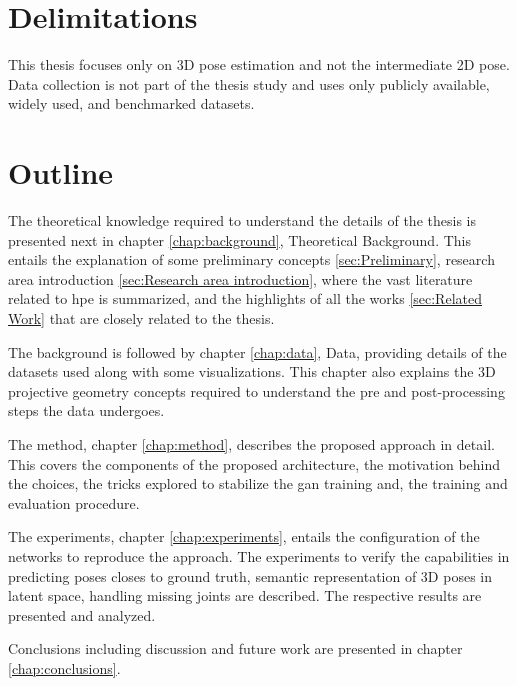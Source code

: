 \section{Delimitations}
\label{sec:delimitations}
This thesis focuses only on 3D pose estimation and not the intermediate 2D pose. Data collection is not part of the thesis study and uses only publicly available, widely used, and benchmarked datasets.

\section{Outline}
\label{sec:outline}
The theoretical knowledge required to understand the details of the thesis is presented next in chapter \ref{chap:background}, Theoretical Background. This entails the explanation of some preliminary concepts \ref{sec:Preliminary}, research area introduction \ref{sec:Research area introduction}, where the vast literature related to \ac{hpe} is summarized, and the highlights of all the works \ref{sec:Related Work} that are closely related to the thesis.

The background is followed by chapter \ref{chap:data}, Data,  providing details of the datasets used along with some visualizations. This chapter also explains the 3D projective geometry concepts required to understand the pre and post-processing steps the data undergoes.

The method, chapter \ref{chap:method}, describes the proposed approach in detail. This covers the components of the proposed architecture, the motivation behind the choices, the tricks explored to stabilize the \ac{gan} training and, the training and evaluation procedure.

The experiments, chapter \ref{chap:experiments}, entails the configuration of the networks to reproduce the approach. The experiments to verify the capabilities in predicting poses closes to ground truth, semantic representation of 3D poses in latent space, handling missing joints are described. The respective results are presented and analyzed.  

Conclusions including discussion and future work are presented in chapter \ref{chap:conclusions}.


